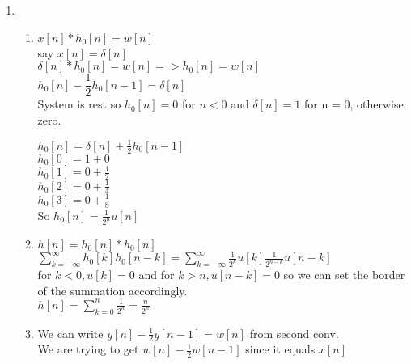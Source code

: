 \documentclass[10pt,a4paper, margin=1in]{article}
\begin{document}
\begin{enumerate}
\item %
    \begin{enumerate}
    \item %
    $x[n] * h_0[n] = w[n]$ \\

    say $x[n] = \delta[n]$\\

    $\delta[n] * h_0[n] = w[n] => h_0[n] = w[n]$ \\

    $h_0[n] - \dfrac{1}{2}h_0[n-1] = \delta[n]$ \\

    System is rest so $h_0[n] = 0$ for $n < 0$ and $\delta[n] = 1$ for n = 0, otherwise zero.

    $h_0[n] = \delta[n] + \frac{1}{2}h_0[n-1]$ \\

    $h_0[0] = 1 + 0$ \\

    $h_0[1] = 0 + \frac{1}{2}$ \\ 

    $h_0[2] = 0 + \frac{1}{4}$ \\ 

    $h_0[3] = 0 + \frac{1}{8}$ \\

    So $h_0[n] = \frac{1}{2^n}u[n]$
    \item %
    $h[n] = h_0[n] * h_0[n]$ \\

    $\sum_{k=-\infty}^{\infty}h_0[k]h_0[n-k] = \sum_{k=-\infty}^{\infty}\frac{1}{2^k}u[k]\frac{1}{2^{n-k}}u[n-k]$ \\

    for $k < 0, u[k] = 0$ and for $ k > n, u[n-k] = 0$ so we can set the border of the summation accordingly.\\

    $h[n] = \sum_{k=0}^{n}\frac{1}{2^n} = \frac{n}{2^n}$\\

	\item %
	We can write $y[n] - \frac{1}{2}y[n-1]=w[n]$ from second conv.\\

    We are trying to get $w[n] - \frac{1}{2}w[n-1]$ since it equals $x[n]$\\


\end{enumerate}
\end{enumerate}
\end{document}
